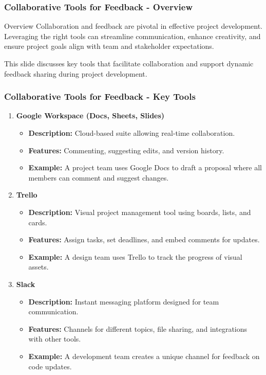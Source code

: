 \documentclass[aspectratio=169]{beamer}
\begin{document}
\begin{frame}[fragile]
    \frametitle{Collaborative Tools for Feedback - Overview}
    \begin{block}{Overview}
        Collaboration and feedback are pivotal in effective project development. Leveraging the right tools can streamline communication, enhance creativity, and ensure project goals align with team and stakeholder expectations. 
    \end{block}
    This slide discusses key tools that facilitate collaboration and support dynamic feedback sharing during project development.
\end{frame}

\begin{frame}[fragile]
    \frametitle{Collaborative Tools for Feedback - Key Tools}
    \begin{enumerate}
        \item \textbf{Google Workspace (Docs, Sheets, Slides)}
            \begin{itemize}
                \item \textbf{Description:} Cloud-based suite allowing real-time collaboration.
                \item \textbf{Features:} Commenting, suggesting edits, and version history.
                \item \textbf{Example:} A project team uses Google Docs to draft a proposal where all members can comment and suggest changes.
            \end{itemize}
        
        \item \textbf{Trello}
            \begin{itemize}
                \item \textbf{Description:} Visual project management tool using boards, lists, and cards.
                \item \textbf{Features:} Assign tasks, set deadlines, and embed comments for updates.
                \item \textbf{Example:} A design team uses Trello to track the progress of visual assets.
            \end{itemize}
        
        \item \textbf{Slack}
            \begin{itemize}
                \item \textbf{Description:} Instant messaging platform designed for team communication.
                \item \textbf{Features:} Channels for different topics, file sharing, and integrations with other tools.
                \item \textbf{Example:} A development team creates a unique channel for feedback on code updates.
            \end{itemize}
    \end{enumerate}
\end{frame}
\end{document}
